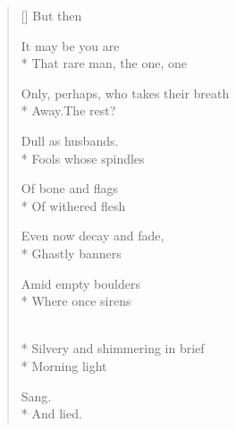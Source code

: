 \label{ch:lear_am}
\settowidth{\versewidth}{Only, perhaps, who takes their breath}
\begin{verse}[\versewidth]
\hspace*{3\vgap} But then

It may be you are\\*
That rare man, the one, one

Only, perhaps, who takes their breath\\*
Away.\qquad The rest?

Dull as husbands.\\*
Fools whose spindles

Of bone and flags\\*
Of withered flesh

Even now decay and fade,\\*
Ghastly banners

Amid empty boulders\\*
Where once sirens

\\*
Silvery and shimmering in brief\\*
Morning light

Sang.\\*
And lied.
\end{verse}

